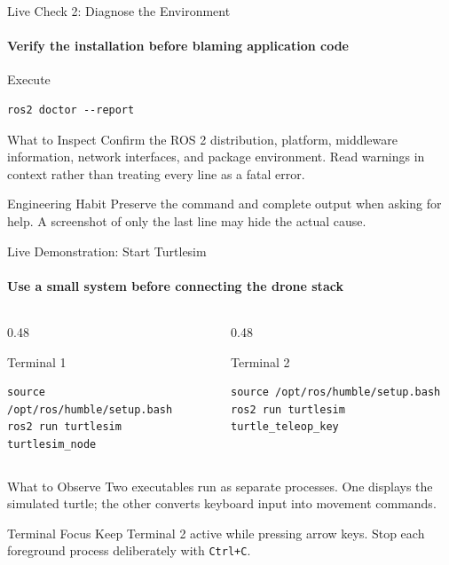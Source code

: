\begin{frame}[fragile]{Live Check 2: Diagnose the Environment}
\framesubtitle{Verify the installation before blaming application code}
\begin{block}{Execute}
\begin{verbatim}
ros2 doctor --report
\end{verbatim}
\end{block}
\begin{exampleblock}{What to Inspect}
Confirm the ROS 2 distribution, platform, middleware information, network interfaces, and package environment. Read warnings in context rather than treating every line as a fatal error.
\end{exampleblock}
\begin{alertblock}{Engineering Habit}
Preserve the command and complete output when asking for help. A screenshot of only the last line may hide the actual cause.
\end{alertblock}
\end{frame}

\begin{frame}[fragile]{Live Demonstration: Start Turtlesim}
\framesubtitle{Use a small system before connecting the drone stack}
\begin{columns}[T,onlytextwidth]
\begin{column}{0.48\textwidth}
\begin{block}{Terminal 1}
\begin{verbatim}
source /opt/ros/humble/setup.bash
ros2 run turtlesim turtlesim_node
\end{verbatim}
\end{block}
\end{column}
\begin{column}{0.48\textwidth}
\begin{block}{Terminal 2}
\begin{verbatim}
source /opt/ros/humble/setup.bash
ros2 run turtlesim turtle_teleop_key
\end{verbatim}
\end{block}
\end{column}
\end{columns}
\begin{exampleblock}{What to Observe}
Two executables run as separate processes. One displays the simulated turtle; the other converts keyboard input into movement commands.
\end{exampleblock}
\begin{alertblock}{Terminal Focus}
Keep Terminal 2 active while pressing arrow keys. Stop each foreground process deliberately with \texttt{Ctrl+C}.
\end{alertblock}
\end{frame}

